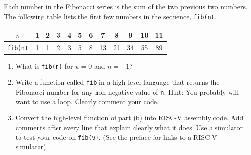 \documentclass[12pt]{article}
\newenvironment{ex}[2][Exercise]{\begin{trivlist}
		\item[\hskip \labelsep {\bfseries #1}\hskip \labelsep {\bfseries #2.}]}{\end{trivlist}}
\begin{document}
\begin{ex}{6.19}
	Each number in the Fibonacci series is the sum of the two previous two
	numbers. The following table lists the first few numbers in the sequence,
	\texttt{fib(n)}.
	\begin{center}
		\begin{tabular}{c|ccccccccccc}
			\hline
			$n$ & 1 & 2 & 3 & 4 & 5 & 6 & 7 & 8 & 9 & 10 & 11\\
			\hline
			\texttt{fib(n)} & 1 & 1 & 2 & 3 & 5 & 8 & 13 & 21 & 34 & 55 & 89\\
			\hline
		\end{tabular}
	\end{center}
	\begin{enumerate}[label=(\alph*)]
		\item What is \texttt{fib(n)} for $n=0$ and $n=-1$?
		\item Write a function called \texttt{fib} in a high-level language that
		returns the Fibonacci number for any non-negative value of \texttt{n}.
		Hint: You probably will want to use a loop. Clearly comment your code.
		\item Convert the high-level function of part (b) into RISC-V assembly
		code. Add comments after every line that explain clearly what it does.
		Use a simulator to test your code on \texttt{fib(9)}. (See the preface for
		links to a RISC-V simulator).
	\end{enumerate}
\end{ex}
\end{document}
